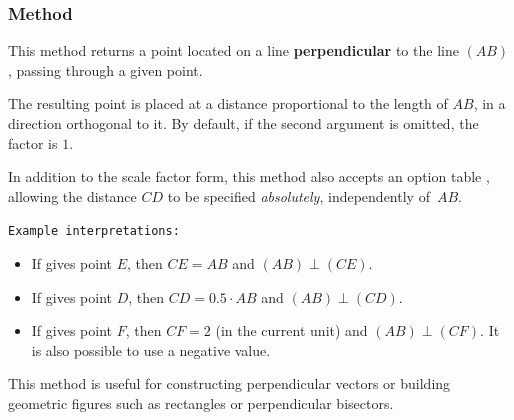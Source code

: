 \subsubsection{Method } %
\label{ssub:method_line_orthogonal__at}

This method returns a point located on a line \textbf{perpendicular} to the line $(AB)$, passing through a given point.

The resulting point is placed at a distance proportional to the length of $AB$, in a direction orthogonal to it.
By default, if the second argument is omitted, the factor is $1$.

\medskip
In addition to the scale factor form, this method also accepts an option table
, allowing the distance $CD$ to be specified
\emph{absolutely}, independently of~$AB$.

\medskip

\texttt{Example interpretations:}
\begin{itemize}
  \item If  gives point $E$, then $CE = AB$ and $(AB) \perp (CE)$.
  \item If  gives point $D$, then $CD = 0.5 \cdot AB$ and $(AB) \perp (CD)$.
  \item If  gives point $F$, then $CF = 2$ (in the current unit) and $(AB) \perp (CF)$. It is also possible to use a negative value.
\end{itemize}

This method is useful for constructing perpendicular vectors or building geometric figures such as rectangles or perpendicular bisectors.

\vspace{1em}
\begin{tkzexample}[latex =.5\textwidth]
\begin{center}
\end{center}
\end{tkzexample}



